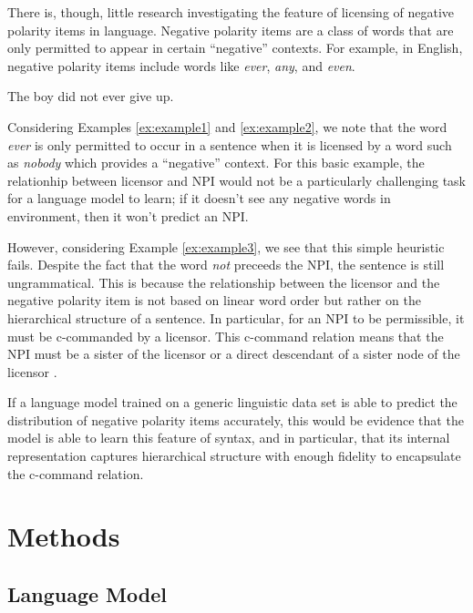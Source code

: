 \documentclass[11pt, round]{article}
\begin{document}
There is, though, little research investigating the feature of licensing of negative polarity items in language. Negative polarity items are a class of words that are only permitted to appear in certain ``negative'' contexts. For example, in English, negative polarity items include words like \textit{ever}, \textit{any}, and \textit{even}.
\begin{exe}
\ex \begin{xlist}
\ex \label{ex:example1} The boy did not ever give up.
\end{xlist}
\end{exe}
Considering Examples \ref{ex:example1} and \ref{ex:example2}, we note that the word \textit{ever} is only permitted to occur in a sentence when it is licensed by a word such as \textit{nobody} which provides a ``negative'' context. For this basic example, the relationhip between licensor and NPI would not be a particularly challenging task for a language model to learn; if it doesn't see any negative words in environment, then it won't predict an NPI. 

However, considering Example \ref{ex:example3}, we see that this simple heuristic fails. Despite the fact that the word \textit{not} preceeds the NPI, the sentence is still ungrammatical. This is because the relationship between the licensor and the negative polarity item is not based on linear word order but rather on the hierarchical structure of a sentence. In particular, for an NPI to be permissible, it must be c-commanded by a licensor. This c-command relation means that the NPI must be a sister of the licensor or a direct descendant of a sister node of the licensor \cite{ladusaw1980notion}.

If a language model trained on a generic linguistic data set is able to predict the distribution of negative polarity items accurately, this would be evidence that the model is able to learn this feature of syntax, and in particular, that its internal representation captures hierarchical structure with enough fidelity to encapsulate the c-command relation.

\section{Methods}

\subsection{Language Model}
\end{document}
